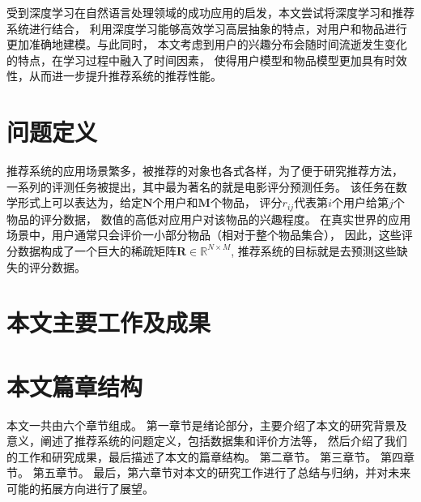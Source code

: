 受到深度学习在自然语言处理领域的成功应用的启发，本文尝试将深度学习和推荐系统进行结合，
利用深度学习能够高效学习高层抽象的特点，对用户和物品进行更加准确地建模。与此同时，
本文考虑到用户的兴趣分布会随时间流逝发生变化的特点，在学习过程中融入了时间因素，
使得用户模型和物品模型更加具有时效性，从而进一步提升推荐系统的推荐性能。

\section{问题定义}
推荐系统的应用场景繁多，被推荐的对象也各式各样，为了便于研究推荐方法，
一系列的评测任务被提出，其中最为著名的就是电影评分预测任务。
该任务在数学形式上可以表达为，给定$\mathbf{N}$个用户和$\mathbf{M}$个物品，
评分$r_{ij}$代表第$i$个用户给第$j$个物品的评分数据，
数值的高低对应用户对该物品的兴趣程度。
在真实世界的应用场景中，用户通常只会评价一小部分物品（相对于整个物品集合），
因此，这些评分数据构成了一个巨大的稀疏矩阵$\mathbf{R} \in \mathbb{R}^{N \times M}$,
推荐系统的目标就是去预测这些缺失的评分数据。

\section{本文主要工作及成果}

\section{本文篇章结构}
本文一共由六个章节组成。
第一章节是绪论部分，主要介绍了本文的研究背景及意义，阐述了推荐系统的问题定义，包括数据集和评价方法等，
然后介绍了我们的工作和研究成果，最后描述了本文的篇章结构。
第二章节。
第三章节。
第四章节。
第五章节。
最后，第六章节对本文的研究工作进行了总结与归纳，并对未来可能的拓展方向进行了展望。


